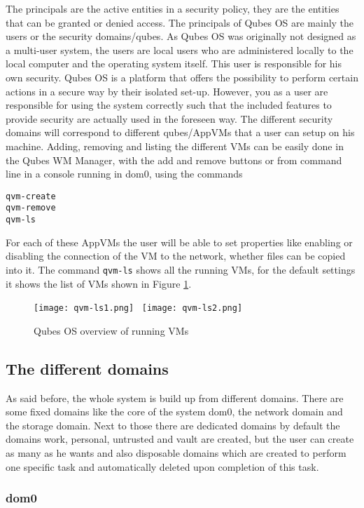 \documentclass[runningheads,a4paper]{article}
\begin{document}
The principals are the active entities in a security policy, they are
the entities that can be granted or denied access. The principals of
Qubes OS are mainly the users or the security domains/qubes.
As Qubes OS was originally not designed
as a multi-user system, the users are local users who are administered
locally to the local computer and the operating system itself. This
user is responsible for his own security. Qubes OS is a platform that
offers the possibility to perform certain actions in a secure way by
their isolated set-up. However, you as a user are responsible for
using the system correctly such that the included features to
provide security are actually used in the foreseen way. The different
security domains will correspond to different qubes/AppVMs that a user
can setup on his machine. Adding, removing and listing the different
VMs can be easily done in the Qubes WM Manager, with the add and
remove buttons or from command line in a console running in dom0,
using the commands
\begin{verbatim}
qvm-create
qvm-remove
qvm-ls
\end{verbatim}
For each of these AppVMs the user will be able to set properties like
enabling or disabling the connection of the VM to the network, whether
files can be copied into it. 
The command \texttt{qvm-ls} shows all the running VMs, for the default settings it shows the list of VMs shown in Figure \ref{fig:qvm-ls}.

\begin{figure}[h]
  \centering
  \texttt{[image: qvm-ls1.png]}~
  \texttt{[image: qvm-ls2.png]}
  \caption{Qubes OS overview of running VMs}
  \label{fig:qvm-ls}
\end{figure}

\subsection{The different domains}
As said before, the whole system is build up from different
domains. There are some fixed domains like the core of the system
dom0, the network domain and the storage domain. Next to those there
are dedicated domains by default the domains work, personal,
untrusted and vault are created, but the user can create as many as he wants and
also disposable domains which are created to perform one specific task
and automatically deleted upon completion of this task.

\subsubsection{dom0}
\end{document}

